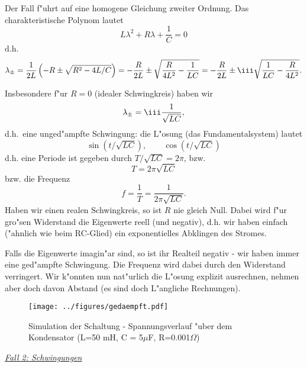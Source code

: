 Der Fall f"uhrt auf eine homogene Gleichung zweiter Ordnung. Das charakteristische Polynom lautet
$$ L \lambda^2 + R\lambda + \frac 1 C =0$$
d.h.
$$ \lambda_\pm = \frac 1 {2L}\left(
- R \pm\sqrt{R^2 - 4 L/C}
\right)
=
-\frac R{2L}\pm\sqrt{\frac R{4L^2} - \frac 1 {LC}}
=
-\frac R{2L}\pm\iii \sqrt{\frac 1 {LC} - \frac R{4L^2}}
.$$

Insbesondere f"ur $R=0$ (idealer Schwingkreis) haben wir
$$ \lambda_\pm = \iii\frac{1}{\sqrt{L C}},$$
d.h.\ eine unged"ampfte Schwingung: die L"osung (das Fundamentalsystem) lautet
$$ \sin(t/\sqrt{LC}),\qquad \cos(t/\sqrt{LC})$$
d.h. eine Periode ist gegeben durch $T/\sqrt{LC}=2\pi$, bzw.
$$ T = 2\pi\sqrt{LC}$$
bzw. die Frequenz
$$ f = \frac 1 T = \frac 1 {2\pi\sqrt{LC}}.$$
Haben wir einen realen Schwingkreis, so ist $R$ nie gleich Null. 
Dabei wird f"ur gro"sen Widerstand die Eigenwerte reell (und negativ), d.h. wir haben einfach
("ahnlich wie beim RC-Glied) ein exponentielles Abklingen des Stromes.\par
Falls die Eigenwerte imagin"ar sind, so ist ihr Realteil negativ - wir haben immer eine ged"ampfte Schwingung.
Die Frequenz wird dabei durch den Widerstand verringert. Wir k"onnten nun nat"urlich die L"osung explizit ausrechnen, nehmen aber doch davon Abstand (es sind doch L"angliche Rechnungen).


\begin{figure}[htbp] %
   \centering
   \texttt{[image: ../figures/gedaempft.pdf]} 
   \caption{Simulation der Schaltung - Spannungsverlauf "uber dem Kondensator (L=50 mH, C = 5$\mu$F, R=0.001$\Omega$)
   }
   \label{ele3}
\end{figure}


\underline{{\it Fall 2: Schwingungen}}\par

